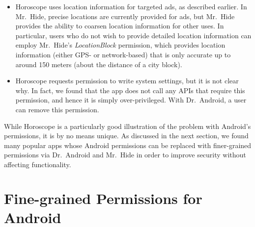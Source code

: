 \documentclass[preprint]{sig-alternate-10pt}
\newcommand{\lib}{Mr.\ Hide\xspace}
\newcommand{\rewriter}{Dr.\ Android\xspace}
\newcommand{\perm}[1]{\textsf{\textit{#1}}}
\begin{document}
\begin{itemize}

\item Horoscope uses location information for targeted ads, as
  described earlier.  In \lib, precise locations are currently
  provided for ads, but \lib provides the ability to coarsen location
  information for other uses. In particular, users
  who do not wish to provide detailed
  location information can employ \lib's \perm{LocationBlock}
  permission, which  provides location information (either GPS- or
  network-based) that is only accurate up to around 150 meters (about
  the distance of a city block).

\item Horoscope requests permission to write system settings, but it
  is not clear why. In fact, we found that the app does not call any APIs
  that require this permission, and hence it is simply
  over-privileged. With \rewriter, a user can remove this permission.
\end{itemize}

While Horoscope is a particularly good illustration of the problem
with Android's permissions, it is by no means unique.
As discussed in the next section, we found many popular apps whose Android
permissions can be replaced with finer-grained permissions via
\rewriter and \lib in order to improve security without affecting
functionality.

\section{Fine-grained Permissions for Android}
\label{sec:overview}
\end{document}
